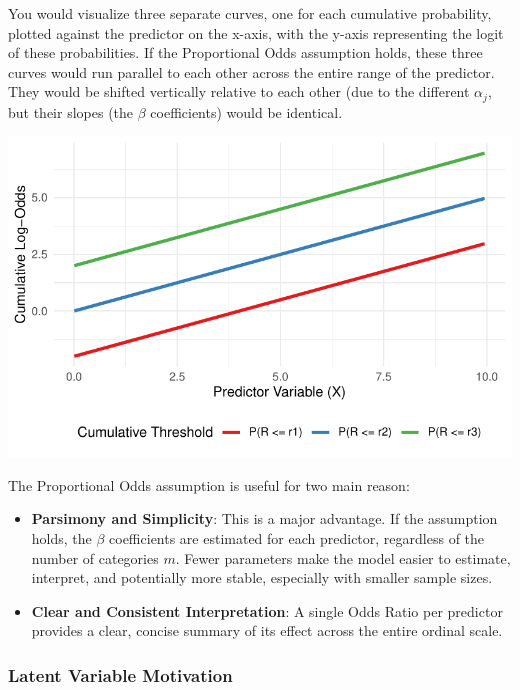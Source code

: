 \documentclass[
  letterpaper,
  DIV=11,
  numbers=noendperiod]{scrartcl}
\begin{document}
You would visualize three separate curves, one for each cumulative
probability, plotted against the predictor on the x-axis, with the
y-axis representing the logit of these probabilities. If the
Proportional Odds assumption holds, these three curves would run
parallel to each other across the entire range of the predictor. They
would be shifted vertically relative to each other (due to the different
\(\alpha_j\), but their slopes (the \(\beta\) coefficients) would be
identical.

\includegraphics{Ordinal_data_an_R_files/figure-pdf/unnamed-chunk-7-1.pdf}

The Proportional Odds assumption is useful for two main reason:

\begin{itemize}
\item
  \textbf{Parsimony and Simplicity}: This is a major advantage. If the
  assumption holds, the \(\beta\) coefficients are estimated for each
  predictor, regardless of the number of categories \(m\). Fewer
  parameters make the model easier to estimate, interpret, and
  potentially more stable, especially with smaller sample sizes.
\item
  \textbf{Clear and Consistent Interpretation}: A single Odds Ratio per
  predictor provides a clear, concise summary of its effect across the
  entire ordinal scale.
\end{itemize}

\hypertarget{latent-variable-motivation}{%
\subsubsection*{Latent Variable
Motivation}\label{latent-variable-motivation}}
\end{document}
